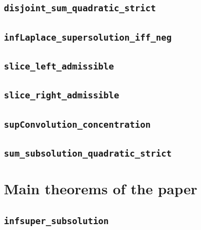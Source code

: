 \documentclass[11pt]{amsart}
\theoremstyle{definition}
\begin{document}
\subsection{\texorpdfstring{\texttt{disjoint\_sum\_quadratic\_strict}}{disjoint_sum_quadratic_strict}}\label{node:disjoint_sum_quadratic_strict}


\subsection{\texorpdfstring{\texttt{infLaplace\_supersolution\_iff\_neg}}{infLaplace_supersolution_iff_neg}}\label{node:infLaplace_supersolution_iff_neg}


\subsection{\texorpdfstring{\texttt{slice\_left\_admissible}}{slice_left_admissible}}\label{node:slice_left_admissible}


\subsection{\texorpdfstring{\texttt{slice\_right\_admissible}}{slice_right_admissible}}\label{node:slice_right_admissible}


\subsection{\texorpdfstring{\texttt{supConvolution\_concentration}}{supConvolution_concentration}}\label{node:supConvolution_concentration}


\subsection{\texorpdfstring{\texttt{sum\_subsolution\_quadratic\_strict}}{sum_subsolution_quadratic_strict}}\label{node:sum_subsolution_quadratic_strict}


\section{Main theorems of the paper}
\subsection{\texorpdfstring{\texttt{infsuper\_subsolution}}{infsuper_subsolution}}\label{node:infsuper_subsolution}

\end{document}

